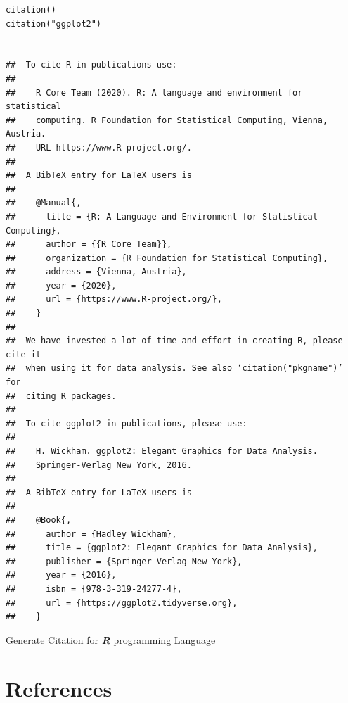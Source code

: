 \documentclass[11pt]{article}
\begin{document}
\begin{listing}[htbp]
\begin{verbatim}
citation()
citation("ggplot2")


##  To cite R in publications use:
##
##    R Core Team (2020). R: A language and environment for statistical
##    computing. R Foundation for Statistical Computing, Vienna, Austria.
##    URL https://www.R-project.org/.
##
##  A BibTeX entry for LaTeX users is
##
##    @Manual{,
##      title = {R: A Language and Environment for Statistical Computing},
##      author = {{R Core Team}},
##      organization = {R Foundation for Statistical Computing},
##      address = {Vienna, Austria},
##      year = {2020},
##      url = {https://www.R-project.org/},
##    }
##
##  We have invested a lot of time and effort in creating R, please cite it
##  when using it for data analysis. See also ‘citation("pkgname")’ for
##  citing R packages.
##
##  To cite ggplot2 in publications, please use:
##
##    H. Wickham. ggplot2: Elegant Graphics for Data Analysis.
##    Springer-Verlag New York, 2016.
##
##  A BibTeX entry for LaTeX users is
##
##    @Book{,
##      author = {Hadley Wickham},
##      title = {ggplot2: Elegant Graphics for Data Analysis},
##      publisher = {Springer-Verlag New York},
##      year = {2016},
##      isbn = {978-3-319-24277-4},
##      url = {https://ggplot2.tidyverse.org},
##    }
\end{verbatim}
\caption{\label{org95fdc27}Generate Citation for \textbf{\emph{R}} programming Language}
\end{listing}

\section{References}
\label{sec:org7cca151}
\end{document}
